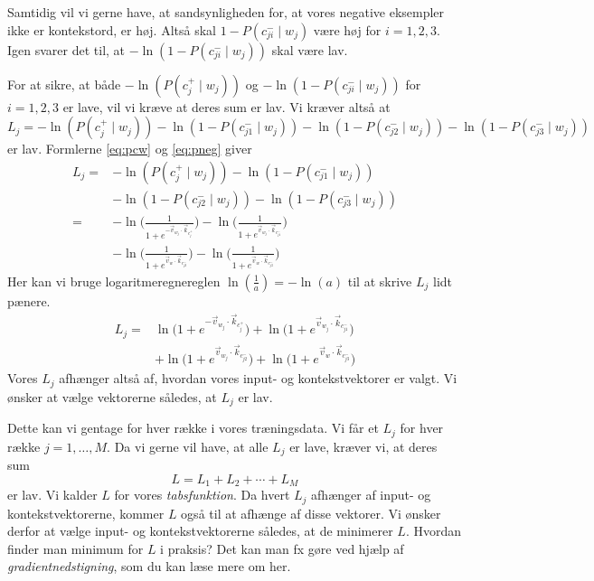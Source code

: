 \documentclass{article}
\newcommand{\am}[1]{{\color{red} #1}}
\begin{document}
Samtidig vil vi gerne have, at sandsynligheden for, at vores negative eksempler ikke er kontekstord, er høj. Altså skal $1-P(c_{ji}^-\mid w_j)$ være høj for $i=1,2,3$. Igen svarer det til, at $-\ln(1-P(c_{ji}^-\mid w_j))$ skal være lav. 

For at sikre, at både $-\ln(P(c_j^+\mid w_j))$ og $-\ln(1-P(c_{ji}^-\mid w_j))$ for $i=1,2,3$ er lave, vil vi kræve at deres sum er lav. Vi kræver altså at
$$L_j = -\ln(P(c_j^+\mid w_j)) -\ln(1-P(c_{j1}^-\mid w_j)) -\ln(1-P(c_{j2}^-\mid w_j)) -\ln(1-P(c_{j3}^-\mid w_j))$$
er lav. Formlerne \eqref{eq:pcw} og \eqref{eq:pneg}  giver
\begin{align*}
L_j =& -\ln(P(c_j^+\mid w_j)) -\ln(1-P(c_{j1}^-\mid w_j))\\
&-\ln(1-P(c_{j2}^-\mid w_j)) -\ln(1-P(c_{j3}^-\mid w_j))
\\=& -\ln \bigg(\frac{1}{1+e^{-\overrightarrow{v}_{w_j} \cdot \overrightarrow{k}_{c^+_j}}}\bigg) - \ln\bigg(\frac{1}{1+e^{\overrightarrow{v}_{w_j} \cdot \overrightarrow{k}_{c_{j1}^-}}}\bigg)\\
&- \ln \bigg(\frac{1}{1+e^{\overrightarrow{v}_{w} \cdot \overrightarrow{k}_{c_{j2}^-}}}\bigg) - \ln\bigg(\frac{1}{1+e^{\overrightarrow{v}_{w} \cdot \overrightarrow{k}_{c_{j3}^-}}}\bigg)
\end{align*}
Her kan vi bruge logaritmeregnereglen $\ln(\tfrac{1}{a}) = -\ln(a)$ til at skrive $L_j$ lidt pænere.
\begin{align*}
L_j =&\ln \Big({1+e^{-\overrightarrow{v}_{w_j} \cdot \overrightarrow{k}_{c^+_j}}}\Big) + \ln\Big({1+e^{\overrightarrow{v}_{w_j} \cdot \overrightarrow{k}_{c_{j1}^-}}}\Big)\\
&+ \ln \Big({1+e^{\overrightarrow{v}_{w_j} \cdot \overrightarrow{k}_{c_{j2}^-}}}\Big) + \ln\Big({1+e^{\overrightarrow{v}_{w} \cdot \overrightarrow{k}_{c_{j3}^-}}}\Big)
\end{align*}
Vores $L_j$ afhænger altså af, hvordan vores input- og kontekstvektorer er valgt. Vi ønsker at vælge vektorerne således, at $L_j$ er lav.

Dette kan vi gentage for hver række i vores træningsdata. Vi får et $L_j$ for hver række $j=1,\ldots,M$. Da vi gerne vil have, at alle $L_j$ er lave, kræver vi, at deres sum 
$$L=L_1+ L_2 +\dotsm + L_M$$
er lav. Vi kalder $L$ for vores \emph{tabsfunktion}. Da hvert $L_j$ afhænger af input- og kontekstvektorerne, kommer $L$ også til at afhænge af disse vektorer. Vi ønsker derfor at vælge input- og kontekstvektorerne således, at de minimerer $L$. Hvordan finder man minimum for $L$ i praksis? Det kan man fx gøre ved hjælp af \emph{gradientnedstigning}, som du kan læse mere om \am{her}.
\end{document}
